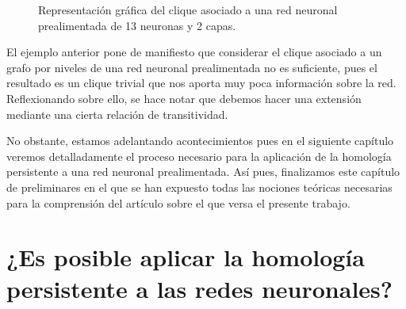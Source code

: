 \documentclass[12pt, a4paper, twoside]{book}
\numberwithin{equation}{section}
\theoremstyle{definition}
\newenvironment{ejem}
  {\pushQED{\qed}\renewcommand{\qedsymbol}{$\blacktriangleleft$}\ejemplo}
  {\popQED\endejemplo}
\theoremstyle{remark}
\theoremstyle{plain}
\begin{document}
\begin{ejem}
\begin{figure}[!htbp]
			\caption{Representación gráfica del clique asociado a una red neuronal prealimentada de 13 neuronas y 2 capas.}
			\label{fig:cliqueEjem}
		\end{figure}
	\end{ejem}

	El ejemplo anterior pone de manifiesto que considerar el clique 
	asociado a un grafo por niveles de una red neuronal prealimentada no 
	es suficiente, pues el resultado es un clique trivial que nos aporta 
	muy poca información sobre la red. Reflexionando sobre ello, se hace 
	notar que debemos hacer una extensión mediante una cierta relación de 
	transitividad. 

	No obstante, estamos adelantando acontecimientos pues en el siguiente 
	capítulo veremos detalladamente el proceso necesario para la 
	aplicación de la homología persistente a una red neuronal 
	prealimentada. Así pues, finalizamos este capítulo de preliminares en
	el que se han expuesto todas las nociones teóricas necesarias para la 
	comprensión del artículo sobre el que versa el presente trabajo.

	\newpage

	\chapter{¿Es posible aplicar la homología persistente a las redes 
	neuronales?}
	
\end{document}
